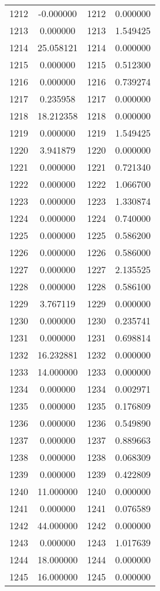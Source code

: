 \documentclass[12pt]{article}
\begin{document}
\begin{longtable}{@{}cccc@{}}
1212 & -0.000000 & 1212 & 0.000000 \\
1213 & 0.000000 & 1213 & 1.549425 \\
1214 & 25.058121 & 1214 & 0.000000 \\
1215 & 0.000000 & 1215 & 0.512300 \\
1216 & 0.000000 & 1216 & 0.739274 \\
1217 & 0.235958 & 1217 & 0.000000 \\
1218 & 18.212358 & 1218 & 0.000000 \\
1219 & 0.000000 & 1219 & 1.549425 \\
1220 & 3.941879 & 1220 & 0.000000 \\
1221 & 0.000000 & 1221 & 0.721340 \\
1222 & 0.000000 & 1222 & 1.066700 \\
1223 & 0.000000 & 1223 & 1.330874 \\
1224 & 0.000000 & 1224 & 0.740000 \\
1225 & 0.000000 & 1225 & 0.586200 \\
1226 & 0.000000 & 1226 & 0.586000 \\
1227 & 0.000000 & 1227 & 2.135525 \\
1228 & 0.000000 & 1228 & 0.586100 \\
1229 & 3.767119 & 1229 & 0.000000 \\
1230 & 0.000000 & 1230 & 0.235741 \\
1231 & 0.000000 & 1231 & 0.698814 \\
1232 & 16.232881 & 1232 & 0.000000 \\
1233 & 14.000000 & 1233 & 0.000000 \\
1234 & 0.000000 & 1234 & 0.002971 \\
1235 & 0.000000 & 1235 & 0.176809 \\
1236 & 0.000000 & 1236 & 0.549890 \\
1237 & 0.000000 & 1237 & 0.889663 \\
1238 & 0.000000 & 1238 & 0.068309 \\
1239 & 0.000000 & 1239 & 0.422809 \\
1240 & 11.000000 & 1240 & 0.000000 \\
1241 & 0.000000 & 1241 & 0.076589 \\
1242 & 44.000000 & 1242 & 0.000000 \\
1243 & 0.000000 & 1243 & 1.017639 \\
1244 & 18.000000 & 1244 & 0.000000 \\
1245 & 16.000000 & 1245 & 0.000000 \\

\end{longtable}
\end{document}
